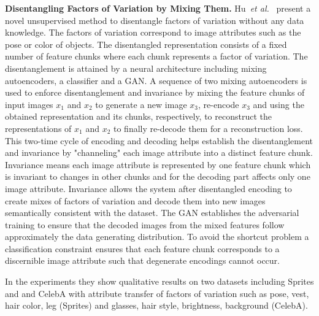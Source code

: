 \documentclass[12pt,a4paper]{article}
\begin{document}
\par \textbf{Disentangling Factors of Variation by Mixing Them.} Hu~\textit{et al.}~\cite{DisentFacOfVarByMixTh} present a novel unsupervised method to disentangle factors of variation without any data knowledge. The factors of variation correspond to image attributes such as the pose or color of objects. The disentangled representation consists of a fixed number of feature chunks where each chunk represents a factor of variation. The disentanglement is attained by a neural architecture including mixing autoencoders, a classifier and a GAN. A sequence of two mixing autoencoders is used to enforce disentanglement and invariance by mixing the feature chunks of input images $x_1$ and $x_2$ to generate a new image $x_3$, re-encode $x_3$ and using the obtained representation and its chunks, respectively, to reconstruct the representations of $x_1$ and $x_2$ to finally re-decode them for a reconstruction loss. This two-time cycle of encoding and decoding helps establish the disentanglement and invariance by "channeling" each image attribute into a distinct feature chunk. Invariance means each image attribute is represented by one feature chunk which is invariant to changes in other chunks and for the decoding part affects only one image attribute. Invariance allows the system after disentangled encoding to create mixes of factors of variation and decode them into new images semantically consistent with the dataset. The GAN establishes the adversarial training to ensure that the decoded images from the mixed features follow approximately the data generating distribution. To avoid the shortcut problem a classification constraint ensures that each feature chunk corresponds to a discernible image attribute such that degenerate encodings cannot occur.


In the experiments they show qualitative results on two datasets including Sprites and and CelebA with attribute transfer of factors of variation such as pose, vest, hair color, leg (Sprites) and glasses, hair style, brightness, background (CelebA).
\end{document}
